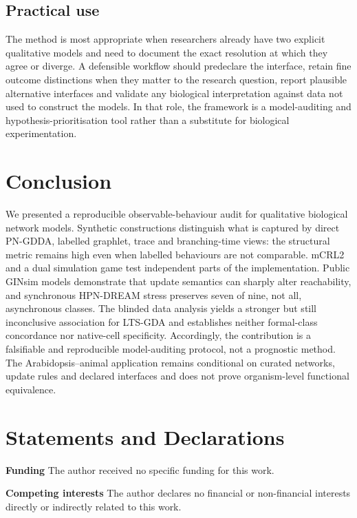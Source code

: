 \documentclass[pdflatex,sn-mathphys-ay]{sn-jnl}
\theoremstyle{definition}
\begin{document}
\subsection{Practical use}\label{sec:discussion-use}

The method is most appropriate when researchers already have two explicit
qualitative models and need to document the exact resolution at which they agree
or diverge. A defensible workflow should predeclare the interface, retain fine
outcome distinctions when they matter to the research question, report plausible
alternative interfaces and validate any biological interpretation against data
not used to construct the models. In that role, the framework is a model-auditing
and hypothesis-prioritisation tool rather than a substitute for biological
experimentation.

\section{Conclusion}\label{sec:conclusion}

We presented a reproducible observable-behaviour audit for qualitative biological
network models. Synthetic constructions distinguish what is captured by
direct PN-GDDA, labelled graphlet, trace and branching-time views: the structural
metric remains high even when labelled behaviours are not comparable. mCRL2 and
a dual simulation game test independent parts of the implementation. Public GINsim models demonstrate that
update semantics can sharply alter reachability, and synchronous HPN-DREAM
stress preserves seven of nine, not all, asynchronous classes. The blinded data
analysis yields a stronger but still inconclusive association for LTS-GDA and
establishes neither formal-class concordance nor native-cell specificity.
Accordingly, the contribution is a falsifiable and reproducible model-auditing
protocol, not a prognostic method. The Arabidopsis--animal application remains
conditional on curated networks, update rules and declared interfaces and does
not prove organism-level functional equivalence.

\backmatter

\section*{Statements and Declarations}

\noindent\textbf{Funding} The author received no specific funding for this work.

\noindent\textbf{Competing interests} The author declares no financial or non-financial
interests directly or indirectly related to this work.
\end{document}

